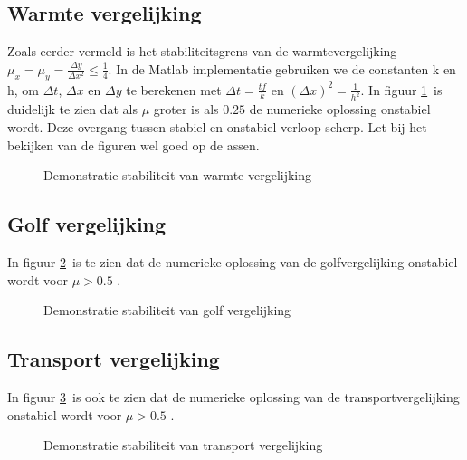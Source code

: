 \documentclass[11pt]{article} %
\begin{document}
	\subsection{Warmte vergelijking}
	Zoals eerder vermeld is het stabiliteitsgrens van de warmtevergelijking  $\mu_x=\mu_y=\frac{\Delta y}{\Delta x^2} \leq \frac{1}{4}$. In de Matlab implementatie gebruiken we de constanten k en h, om $\Delta t$, $\Delta x$ en $\Delta y$ te berekenen met $\Delta t=\frac{tf}{k}$ en $(\Delta x)^2 = \frac{1}{h^2}$. In figuur \ref{fig:Warmte}\ is duidelijk te zien dat als $\mu $ groter is als $0.25$ de numerieke oplossing onstabiel wordt. Deze overgang tussen stabiel en onstabiel verloop scherp. Let bij het bekijken van de figuren wel goed op de assen.


	\begin{figure}[H]
		\centering
	\caption{Demonstratie stabiliteit van warmte vergelijking}
	\label{fig:Warmte}
	\end{figure}
	
	\clearpage
	\subsection{Golf vergelijking}

In figuur \ref{fig:Golf}\ is te zien dat de numerieke oplossing van de golfvergelijking onstabiel wordt voor $\mu > 0.5$ .	
	
	\begin{figure}[H]
		\centering
		\caption{Demonstratie stabiliteit van golf vergelijking}
	\label{fig:Golf}		
	\end{figure}
	
	\clearpage
	
	\subsection{Transport vergelijking}
	In figuur \ref{fig:Transport}\ is ook te zien dat de numerieke oplossing van de transportvergelijking onstabiel wordt voor $\mu > 0.5$ .
	\begin{figure}[H]
		\centering
		\caption{Demonstratie stabiliteit van transport vergelijking}
	\label{fig:Transport}
	\end{figure}
\end{document}
